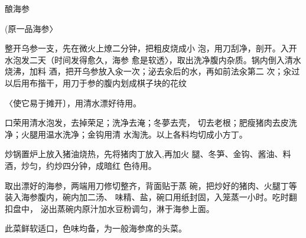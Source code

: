 \begin{recipe}{酿海参}

(原一品海参〉

\ingredients



\cooking

\step 	整开乌参一支，先在微火上燎二分钟，把粗皮烧成小 泡，用刀刮净，剖开。入开水泡发二天（时间发得愈久，海参 愈是软透〉，取出洗净腹内杂质。锅内倒入清水烧沸，加料 酒，把开乌参放入汆一次；泌去汆后的水，再如前法汆第二 次；汆过以后用布揩干，用刀于参的腹内划成棋子块的花纹

〈使它易于摊开〕，用清水漂好待用。

\step 	口荣用清水泡发，去掉荣足；洗净去淹；冬夢去壳， 切去老根；肥瘦猪肉去皮洗净；火腿用温水洗净；金钩用清 水淘洗。以上各料均切成小方丁。

\step 	炒锅置炉上放入猪油烧热，先将猪肉丁放入,再加火 腿、冬笋、金钩、酱油、料酒，炒匀，约炒四分钟，成暗红 色待用。

取出漂好的海参，两端用刀修切整齐，背面贴于蒸 碗，把炒好的猪肉、火腿丁等装入海参腹内，碗内加二汤、 味精、盐，碗口用纸封固，入笼蒸一小时。吃时翻扣盘中， 泌出蒸碗内原汁加水豆粉调匀，淋于海参上面。

\notes

此菜鲜软适口，色味均备，为一般海参席的头菜。

\end{recipe}

